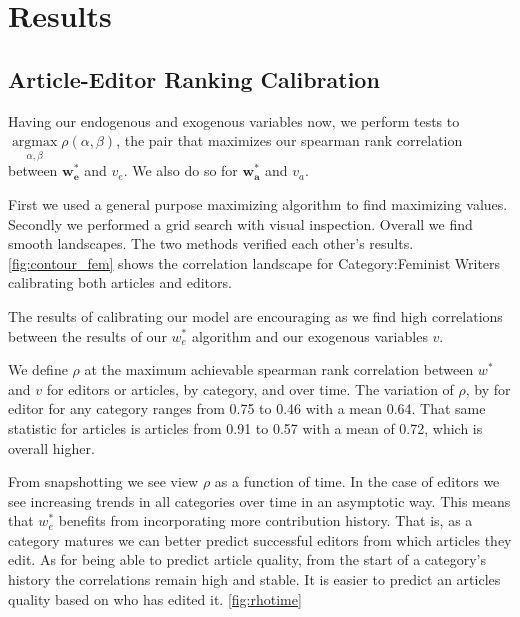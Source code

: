 \section{Results}

\subsection{Article-Editor Ranking Calibration}

Having our endogenous and exogenous variables now, we perform tests to
$\underset{\alpha, \beta}{\operatorname{argmax}} \rho(\alpha, \beta)$, the pair that maximizes our spearman rank correlation between  $\mathbf{w^{*}_{e}}$ and $v_e$. We also do so for $\mathbf{w^{*}_{a}}$ and $v_a$.

First we used a general purpose maximizing algorithm to find maximizing values. Secondly we performed a grid search with visual inspection. Overall we find smooth landscapes. The two methods verified each other's results. \ref{fig:contour_fem} shows the correlation landscape for Category:Feminist Writers calibrating both articles and editors.

The results of calibrating our model are encouraging as we find high correlations between the results of our $w^*_e$ algorithm and our exogenous variables $v$. 

We define $\rho$ at the maximum achievable spearman rank correlation between $w^*$ and $v$ for editors or articles, by category, and over time. The variation of $\rho$, by for editor for any category ranges from 0.75 to 0.46 with a mean 0.64.  That same statistic for articles is articles from 0.91 to 0.57 with a mean of 0.72, which is overall higher.

 
From snapshotting we see view $\rho$ as  a function of time. In the case of editors we see increasing trends in all categories over time in an asymptotic way. This means that $w^*_e$ benefits from incorporating more contribution history. That is, as a category matures we can better predict successful editors from which articles they edit. As for being able to predict article quality, from the start of a category's history the correlations remain high and  stable. It is easier to predict an articles quality based on who has edited it.  \ref{fig:rhotime}

